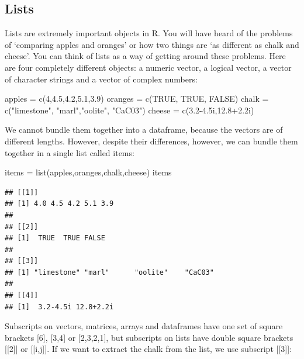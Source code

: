 \documentclass[
]{book}
\newenvironment{Shaded}{\begin{snugshade}}{\end{snugshade}}
\newcommand{\ConstantTok}[1]{\textcolor[rgb]{0.00,0.00,0.00}{#1}}
\newcommand{\DecValTok}[1]{\textcolor[rgb]{0.00,0.00,0.81}{#1}}
\newcommand{\FloatTok}[1]{\textcolor[rgb]{0.00,0.00,0.81}{#1}}
\newcommand{\FunctionTok}[1]{\textcolor[rgb]{0.00,0.00,0.00}{#1}}
\newcommand{\NormalTok}[1]{#1}
\newcommand{\OtherTok}[1]{\textcolor[rgb]{0.56,0.35,0.01}{#1}}
\newcommand{\StringTok}[1]{\textcolor[rgb]{0.31,0.60,0.02}{#1}}
\theoremstyle{definition}
\theoremstyle{definition}
\theoremstyle{definition}
\theoremstyle{definition}
\theoremstyle{remark}
\begin{document}
\hypertarget{lists}{%
\subsection{Lists}\label{lists}}

Lists are extremely important objects in R. You will have heard of the problems of `comparing apples and oranges' or how two things are `as different as chalk and cheese'. You can think of lists as a way of getting around these problems. Here are four completely different objects: a numeric vector, a logical vector, a vector of character strings and a vector of complex numbers:

\begin{Shaded}
\begin{Highlighting}[]
\NormalTok{apples }\OtherTok{=} \FunctionTok{c}\NormalTok{(}\DecValTok{4}\NormalTok{,}\FloatTok{4.5}\NormalTok{,}\FloatTok{4.2}\NormalTok{,}\FloatTok{5.1}\NormalTok{,}\FloatTok{3.9}\NormalTok{)}
\NormalTok{oranges }\OtherTok{=} \FunctionTok{c}\NormalTok{(}\ConstantTok{TRUE}\NormalTok{, }\ConstantTok{TRUE}\NormalTok{, }\ConstantTok{FALSE}\NormalTok{)}
\NormalTok{chalk }\OtherTok{=} \FunctionTok{c}\NormalTok{(}\StringTok{"limestone"}\NormalTok{, }\StringTok{"marl"}\NormalTok{,}\StringTok{"oolite"}\NormalTok{, }\StringTok{"CaC03"}\NormalTok{)}
\NormalTok{cheese }\OtherTok{=} \FunctionTok{c}\NormalTok{(}\FloatTok{3.2{-}4.5}\NormalTok{i,}\FloatTok{12.8+2.2}\NormalTok{i)}
\end{Highlighting}
\end{Shaded}

We cannot bundle them together into a dataframe, because the vectors are of different lengths. However, despite their differences, however, we can bundle them together in a single list called items:

\begin{Shaded}
\begin{Highlighting}[]
\NormalTok{items }\OtherTok{=} \FunctionTok{list}\NormalTok{(apples,oranges,chalk,cheese)}
\NormalTok{items}
\end{Highlighting}
\end{Shaded}

\begin{verbatim}
## [[1]]
## [1] 4.0 4.5 4.2 5.1 3.9
## 
## [[2]]
## [1]  TRUE  TRUE FALSE
## 
## [[3]]
## [1] "limestone" "marl"      "oolite"    "CaC03"    
## 
## [[4]]
## [1]  3.2-4.5i 12.8+2.2i
\end{verbatim}

Subscripts on vectors, matrices, arrays and dataframes have one set of square brackets {[}6{]}, {[}3,4{]} or {[}2,3,2,1{]}, but subscripts on lists have double square brackets {[}{[}2{]}{]} or {[}{[}i,j{]}{]}. If we want to extract the chalk from the list, we use subscript {[}{[}3{]}{]}:
\end{document}
